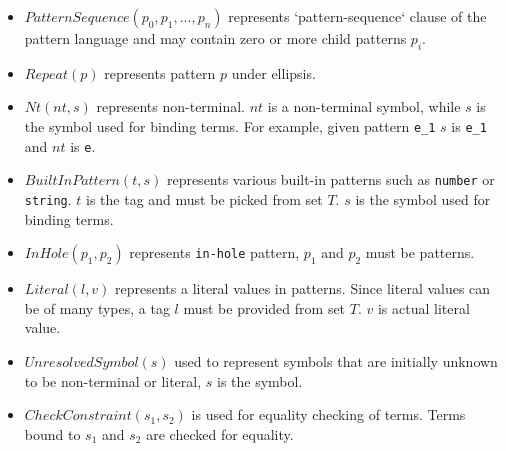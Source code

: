 \newcommand{\PatternSequence}{$PatternSequence(p_0, p_1, ..., p_n)$ }
\newcommand{\Repeat}{$Repeat(p)$ }
\newcommand{\Nt}{$Nt(nt, s)$ }
\newcommand{\BuiltInPattern}{$BuiltInPattern(t, s)$ }
\newcommand{\InHolePattern} {$InHole(p_1, p_2)$ }
\newcommand{\LiteralPattern}{$Literal(l, v)$ }
\newcommand{\UnresolvedSymbol}{$UnresolvedSymbol(s)$ }
\newcommand{\CheckConstraint}{$CheckConstraint(s_1, s_2)$ }


\begin{itemize}
\item
\PatternSequence represents `pattern-sequence` clause of the pattern language and may contain zero or more child patterns $p_i$.

\item 
\Repeat represents pattern $p$ under ellipsis.

\item 
\Nt represents non-terminal. $nt$ is a non-terminal symbol, while $s$ is the symbol used for binding terms. For example, given pattern \texttt{e\_1} $s$ is \texttt{e\_1} and $nt$ is \texttt{e}.

\item
\BuiltInPattern represents various built-in patterns such as \texttt{number} or \texttt{string}. $t$ is the tag and must be picked from set $T$. $s$ is the symbol used for binding terms.

\item
\InHolePattern represents \texttt{in-hole} pattern, $p_1$ and $p_2$ must be patterns.

\item 
\LiteralPattern represents a literal values in patterns. Since literal values can be of many types, a tag $l$ must be provided from set $T$. $v$ is actual literal value.

\item 
\UnresolvedSymbol used to represent symbols that are initially unknown to be non-terminal or literal, $s$ is the symbol.

\item
\CheckConstraint is used for equality checking of terms. Terms bound to $s_1$ and $s_2$ are checked for equality.

\end{itemize}




